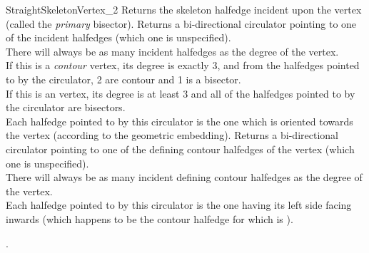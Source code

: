 \begin{ccRefConcept}{StraightSkeletonVertex_2}
\ccAccessFunctions
  \ccGlue
  \ccGlue
  \ccGlue
  \ccGlue
{Returns the skeleton halfedge incident upon the vertex (called the \textit{primary} bisector).}
  \ccGlue
  \ccGlue
{Returns a bi-directional circulator pointing to one of the incident halfedges (which one is unspecified).\\
There will always be as many incident halfedges as the degree of the vertex.\\
If this is a \textit{contour} vertex, its degree is exactly 3, and from the halfedges pointed to by the circulator, 2 are contour and 1 is a bisector.\\
If this is an  vertex, its degree is at least 3 and all of the halfedges pointed to by the circulator are bisectors.\\
Each halfedge pointed to by this circulator is the one which is oriented towards the vertex (according to the geometric embedding).}
  \ccGlue
  \ccGlue
{Returns a bi-directional circulator pointing to one of the defining contour halfedges of the vertex (which one is unspecified).\\
There will always be as many incident defining contour halfedges as the degree of the vertex.\\
Each halfedge pointed to by this circulator is the one having its left side facing inwards (which happens to be the contour halfedge for which  is ).}


\ccGlue
{}

\ccHasModels

.

\ccSeeAlso

\\
\\
\\
\\

\end{ccRefConcept}

